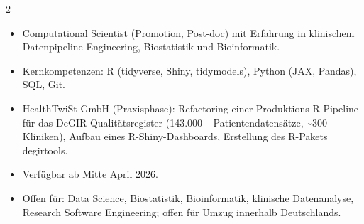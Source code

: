 \documentclass{thejus_cv}
\begin{document}
\begin{paracol}{2}


\begin{itemize}[label=\textbullet, leftmargin=1em]
    \item Computational Scientist (Promotion, Post-doc) mit Erfahrung in klinischem Datenpipeline-Engineering, Biostatistik und Bioinformatik.
    \item Kernkompetenzen: R (tidyverse, Shiny, tidymodels), Python (JAX, Pandas), SQL, Git.
    \item HealthTwiSt GmbH (Praxisphase): Refactoring einer Produktions-R-Pipeline f\"ur das DeGIR-Qualit\"atsregister (143.000+ Patientendatens\"atze, \textasciitilde300 Kliniken), Aufbau eines R-Shiny-Dashboards, Erstellung des R-Pakets degirtools.
    \item Verf\"ugbar ab Mitte April 2026.
    \item Offen f\"ur: Data Science, Biostatistik, Bioinformatik, klinische Datenanalyse, Research Software Engineering; offen f\"ur Umzug innerhalb Deutschlands.
\end{itemize}

\vspace{-0.5em}


\end{paracol}
\end{document}
